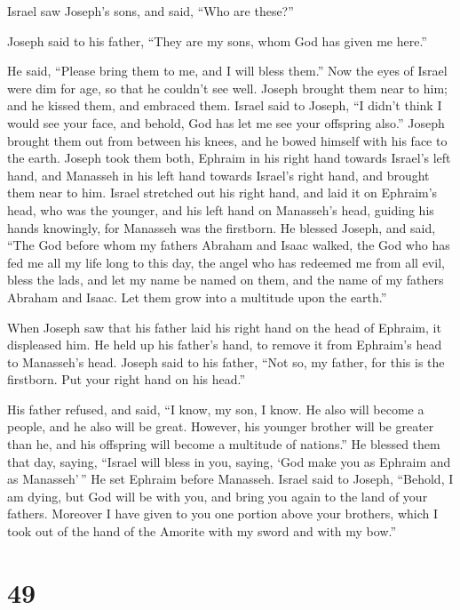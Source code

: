  Israel saw Joseph's sons, and said, ``Who are these?''

 Joseph said to his father, ``They are my sons, whom God has
given me here.''

He said, ``Please bring them to me, and I will bless them.''
 Now the eyes of Israel were dim for age, so that he
couldn't see well. Joseph brought them near to him; and he kissed them,
and embraced them.  Israel said to Joseph, ``I didn't think
I would see your face, and behold, God has let me see your offspring
also.''  Joseph brought them out from between his knees,
and he bowed himself with his face to the earth.  Joseph
took them both, Ephraim in his right hand towards Israel's left hand,
and Manasseh in his left hand towards Israel's right hand, and brought
them near to him.  Israel stretched out his right hand, and
laid it on Ephraim's head, who was the younger, and his left hand on
Manasseh's head, guiding his hands knowingly, for Manasseh was the
firstborn.  He blessed Joseph, and said, ``The God before
whom my fathers Abraham and Isaac walked, the God who has fed me all my
life long to this day,  the angel who has redeemed me from
all evil, bless the lads, and let my name be named on them, and the name
of my fathers Abraham and Isaac. Let them grow into a multitude upon the
earth.''

 When Joseph saw that his father laid his right hand on the
head of Ephraim, it displeased him. He held up his father's hand, to
remove it from Ephraim's head to Manasseh's head.  Joseph
said to his father, ``Not so, my father, for this is the firstborn. Put
your right hand on his head.''

 His father refused, and said, ``I know, my son, I know. He
also will become a people, and he also will be great. However, his
younger brother will be greater than he, and his offspring will become a
multitude of nations.''  He blessed them that day, saying,
``Israel will bless in you, saying, `God make you as Ephraim and as
Manasseh'\,'' He set Ephraim before Manasseh.  Israel said
to Joseph, ``Behold, I am dying, but God will be with you, and bring you
again to the land of your fathers.  Moreover I have given
to you one portion above your brothers, which I took out of the hand of
the Amorite with my sword and with my bow.''

\hypertarget{section-48}{%
\section{49}\label{section-48}}

